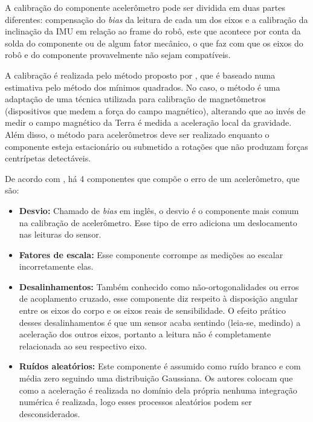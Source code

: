 \documentclass[acronym, symbols, table]{fei}
\begin{document}
			A calibração do componente acelerômetro pode ser dividida em duas partes diferentes: compensação do \textit{bias} da leitura de cada um dos eixos e a calibração da inclinação da IMU em relação ao frame do robô, este que acontece por conta da solda do componente ou de algum fator mecânico, o que faz com que os eixos do robô e do componente provavelmente não sejam compatíveis.
			
			A calibração é realizada pelo método proposto por \textcite{menezes2020triaxial}, que é baseado numa estimativa pelo método dos mínimos quadrados. No caso, o método é uma adaptação de uma técnica utilizada para calibração de magnetômetros (dispositivos que medem a força do campo magnético), alterando que ao invés de medir o campo magnético da Terra é medida a aceleração local da gravidade. Além disso, o método para acelerômetros deve ser realizado enquanto o componente esteja estacionário ou submetido a rotações que não produzam forças centrípetas detectáveis.
			
			De acordo com \textcite{menezes2020triaxial}, há 4 componentes que compõe o erro de um acelerômetro, que são:
			
			\begin{itemize}
				\item \textbf{Desvio:} Chamado de \textit{bias} em inglês, o desvio é o componente mais comum na calibração de acelerômetro. Esse tipo de erro adiciona um deslocamento nas leituras do sensor.
				
				\item \textbf{Fatores de escala:} Esse componente corrompe as medições ao escalar incorretamente elas.
				
				\item \textbf{Desalinhamentos:} Também conhecido como não-ortogonalidades ou erros de acoplamento cruzado, esse componente diz respeito à disposição angular entre os eixos do corpo e os eixos reais de sensibilidade. O efeito prático desses desalinhamentos é que um sensor acaba sentindo (leia-se, medindo) a aceleração dos outros eixos, portanto a leitura não é completamente relacionada ao seu respectivo eixo.
				
				\item \textbf{Ruídos aleatórios:} Este componente é assumido como ruído branco e com média zero seguindo uma distribuição Gaussiana. Os autores colocam que como a aceleração é realizada no domínio dela própria nenhuma integração numérica é realizada, logo esses processos aleatórios podem ser desconsiderados.
			\end{itemize}
			
\end{document}
